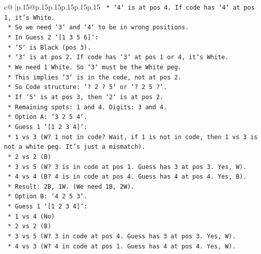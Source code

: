 \documentclass{article}
\begin{document}
{\begin{supertabular}{c@{$\;$}|p{.15\linewidth}@{}p{.15\linewidth}p{.15\linewidth}p{.15\linewidth}p{.15\linewidth}p{.15\linewidth}}
{{{\texttt{                    *   `4` is at pos 4. If code has `4` at pos 1, it's White.} \\
\texttt{                    *   So we need `3` and `4` to be in wrong positions.} \\
\texttt{                *   In Guess 2 `{[}1 3 5 6{]}`:} \\
\texttt{                    *   `5` is Black (pos 3).} \\
\texttt{                    *   `3` is at pos 2. If code has `3` at pos 1 or 4, it's White.} \\
\texttt{                    *   We need 1 White. So `3` must be the White peg.} \\
\texttt{                    *   This implies `3` is in the code, not at pos 2.} \\
\texttt{                *   So Code structure: `? 2 ? 5` or `? 2 5 ?`.} \\
\texttt{                *   If `5` is at pos 3, then `2` is at pos 2.} \\
\texttt{                *   Remaining spots: 1 and 4. Digits: 3 and 4.} \\
\texttt{                *   Option A: `3 2 5 4`.} \\
\texttt{                    *   Guess 1 `{[}1 2 3 4{]}`:} \\
\texttt{                        *   1 vs 3 (W? 1 not in code? Wait, if 1 is not in code, then 1 vs 3 is not a white peg. It's just a mismatch).} \\
\texttt{                        *   2 vs 2 (B)} \\
\texttt{                        *   3 vs 5 (W? 3 is in code at pos 1. Guess has 3 at pos 3. Yes, W).} \\
\texttt{                        *   4 vs 4 (B? 4 is in code at pos 4. Guess has 4 at pos 4. Yes, B).} \\
\texttt{                        *   Result: 2B, 1W. (We need 1B, 2W).} \\
\texttt{                *   Option B: `4 2 5 3`.} \\
\texttt{                    *   Guess 1 `{[}1 2 3 4{]}`:} \\
\texttt{                        *   1 vs 4 (No)} \\
\texttt{                        *   2 vs 2 (B)} \\
\texttt{                        *   3 vs 5 (W? 3 in code at pos 4. Guess has 3 at pos 3. Yes, W).} \\
\texttt{                        *   4 vs 3 (W? 4 in code at pos 1. Guess has 4 at pos 4. Yes, W).} \\
}}}
\end{supertabular}}
\end{document}
